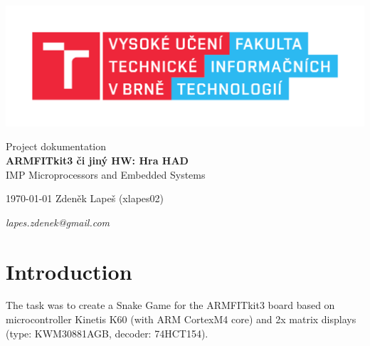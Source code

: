 \documentclass[a4paper, 11pt]{article}
\begin{document}
    \begin{titlepage}
        \begin{center}
            \includegraphics[width=0.77\linewidth]{FIT_logo} \\


            \Huge{Project dokumentation} \\
            \LARGE{\textbf{
                ARM\-FITkit3 či jiný HW: Hra HAD
            }} \\
            \Large{IMP \- Microprocessors and Embedded Systems}

        \end{center}

        {\Large
        \today
        \hfill
        Zdeněk Lapeš (xlapes02)

            \hfill
            \large{\textit{lapes.zdenek@gmail.com}}
        }
    \end{titlepage}


    \setcounter{page}{1}
    \tableofcontents
    \clearpage


    \setcounter{page}{1}




    \section{Introduction}\label{sec:introduction}
    The task was to create a Snake Game for the ARM\-FITkit3 board based on
    microcontroller Kinetis K60 (with ARM Cortex\-M4 core) and 2x matrix displays
    (type: KWM\-30881AGB, decoder: 74HCT154).
\end{document}
